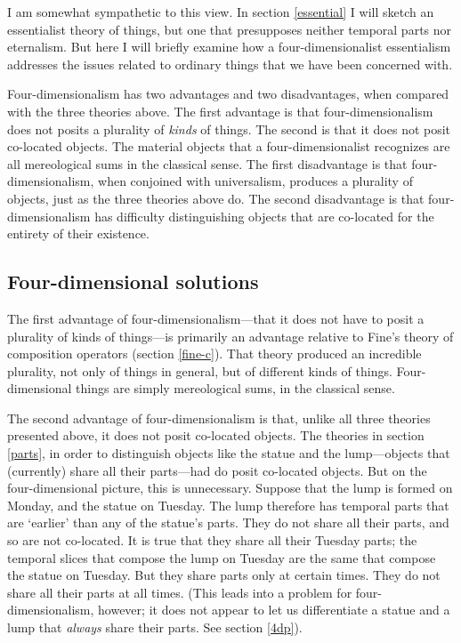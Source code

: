 \documentclass[11pt]{article}
\begin{document}
\begin{spacing}{1.5}
I am somewhat sympathetic to this view.  In section \ref{essential} I
will sketch an essentialist theory of things, but one that presupposes
neither temporal parts nor eternalism.  But here I will briefly
examine how a four-dimensionalist essentialism addresses the issues
related to ordinary things that we have been concerned with.

Four-dimensionalism has two advantages and two disadvantages, when
compared with the three theories above.  The first advantage is that
four-dimensionalism does not posits a plurality of {\em kinds} of
things.  The second is that it does not posit co-located objects.  The
material objects that a four-dimensionalist recognizes are all
mereological sums in the classical sense.  The first disadvantage is
that four-dimensionalism, when conjoined with universalism, produces a
plurality of objects, just as the three theories above do.  The second
disadvantage is that four-dimensionalism has difficulty distinguishing
objects that are co-located for the entirety of their existence.

\subsection{Four-dimensional solutions}
\label{4ds}
The first advantage of four-dimensionalism---that it does not have to
posit a plurality of kinds of things---is primarily an advantage
relative to Fine's theory of composition operators (section
\ref{fine-c}).  That theory produced an incredible plurality, not only
of things in general, but of different kinds of things.
Four-dimensional things are simply mereological sums, in the classical
sense.

The second advantage of four-dimensionalism is that, unlike all three
theories presented above, it does not posit co-located objects.  The
theories in section \ref{parts}, in order to distinguish objects like
the statue and the lump---objects that (currently) share all their
parts---had do posit co-located objects.  But on the four-dimensional
picture, this is unnecessary.  Suppose that the lump is formed on
Monday, and the statue on Tuesday.  The lump therefore has temporal
parts that are `earlier' than any of the statue's parts.  They do not
share all their parts, and so are not co-located.  It is true that
they share all their Tuesday parts; the temporal slices that compose
the lump on Tuesday are the same that compose the statue on Tuesday.
But they share parts only at certain times.  They do not share all
their parts at all times.  (This leads into a problem for
four-dimensionalism, however; it does not appear to let us
differentiate a statue and a lump that {\em always} share their parts.
See section \ref{4dp}).


\end{spacing}
\end{document}

